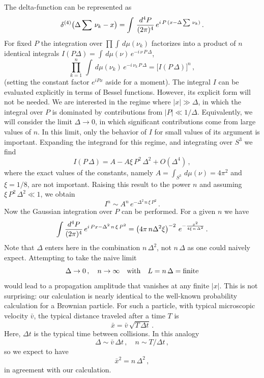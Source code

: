 The delta-function can be represented as
$$
\delta^{(4)}\big(\Delta \sum\,\nu_k - x\big) = \int\,{{d^4 P}\over{(2\pi)^4}} \,e^{i\,P \,(x-\Delta\sum \,\nu_k)}\,.
$$
For fixed $P$ the integration over $\prod \int\,d\mu(\nu_k)$ factorizes into a product of $n$ identical integrals $I(P\Delta)=\int\,d\mu(\nu)\,e^{-i\,\nu\,P\,\Delta}$,
$$
\prod_{k=1}^{n}\,\int\,d\mu(\nu_k)\,e^{-i\,\nu_k\,P\,\Delta} = \big[I(P\,\Delta)\big]^n\,,
$$
(setting the constant factor $e^{iPx}$ aside for a moment).
The integral $I$ can be evaluated explicitly in terms of Bessel functions. However, its explicit form will not be needed. We are interested in the regime where $|x| \gg \Delta$, in which the integral over $P$ is dominated by contributions from $|P| \ll 1/\Delta$. Equivalently, we will consider the limit $\Delta\to 0$, in which significant contributions come from large values of $n$. In this limit, only the behavior of $I$ for small values of its argument is important. Expanding the integrand for this regime, and integrating over $S^3$ we find
$$
I(P\,\Delta) = A - {A}\xi\,P^2 \,\Delta^2 + O(\Delta^4)\,,
$$
where the exact values of the constants, namely $A = \int_{S^3}\,d\mu(\nu) = 4\pi^2$ and $\xi = 1/8$, are not important. Raising this result to the power $n$ and assuming $\xi\,P^2 \,\Delta^2 \ll 1$, we obtain
$$
I^n \sim A^n\,e^{-{\Delta^2 \,n}\,\xi\,P^2}\,.
$$
Now the Gaussian integration over $P$ can be performed. For a given $n$ we have
$$
\int {\frac{d^4 P}{(2\pi)^4} \, e^{i\,P x-{\Delta^2 \,n}\,\xi\,P^2}} = \left(4\pi\,n \Delta^2\xi\right)^{-2}\, e^{-{{x^2}\over {4\xi\,n\,\Delta^2}}}\,.
$$
Note that $\Delta$ enters here in the combination $n\,\Delta^2$, not $n\,\Delta$ as one could naively expect. Attempting to take the naive limit
$$
\Delta\to 0\,, \quad n\to \infty \quad {\rm with} \quad L = {n\,\Delta} = {\rm finite}
$$
would lead to a propagation amplitude that vanishes at any finite $|x|$. This is not surprising: our calculation is nearly identical to the well-known probability calculation for a Brownian particle. For such a particle, with typical microscopic velocity ${\bar v}$, the typical distance traveled after a time $T$ is
$$
{\bar x} = {\bar v}\,\sqrt{T\,\Delta t}\, .
$$
Here, $\Delta t$ is the typical time between collisions. In this analogy
$$
\Delta \sim {\bar v}\,\Delta t\,, \quad n \sim T/\Delta t\, ,
$$
so we expect to have
$$
{\bar x}^2 = n\,\Delta^2\,,
$$
in agreement with our calculation.

